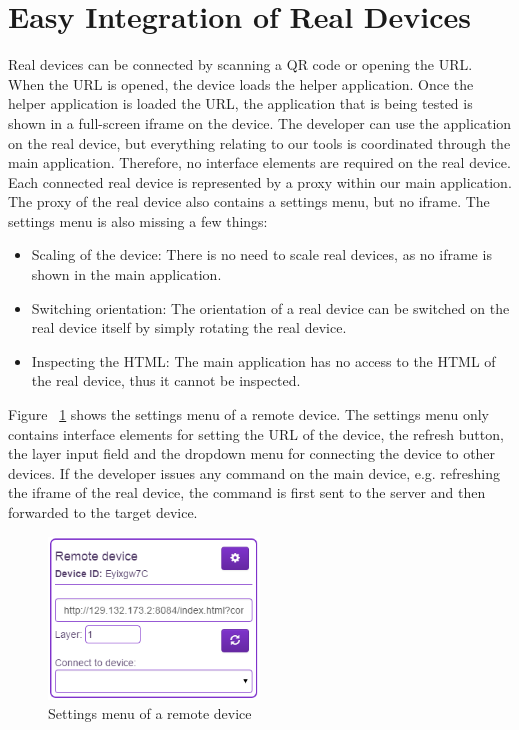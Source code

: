 \section{Easy Integration of Real Devices}

Real devices can be connected by scanning a QR code or opening the URL. When the URL is opened, the device loads the helper application. Once the helper application is loaded the URL, the application that is being tested is shown in a full-screen iframe on the device. The developer can use the application on the real device, but everything relating to our tools is coordinated through the main application. Therefore, no interface elements are required on the real device. Each connected real device is represented by a proxy within our main application. The proxy of the real device also contains a settings menu, but no iframe. The settings menu is also missing a few things:
\begin{itemize}
	\item Scaling of the device: There is no need to scale real devices, as no iframe is shown in the main application.
	\item Switching orientation: The orientation of a real device can be switched on the real device itself by simply rotating the real device.
	\item Inspecting the HTML: The main application has no access to the HTML of the real device, thus it cannot be inspected.
\end{itemize}
Figure ~\ref{fig:settings_menu_remote} shows the settings menu of a remote device. The settings menu only contains interface elements for setting the URL of the device, the refresh button, the layer input field and the dropdown menu for connecting the device to other devices. If the developer issues any command on the main device, e.g. refreshing the iframe of the real device, the command is first sent to the server and then forwarded to the target device. 

\begin{figure}[H]
  \centering
    \includegraphics[width=0.5\textwidth]{images/screenshots/remote_device.png}
	\caption{Settings menu of a remote device}
	\label{fig:settings_menu_remote}
\end{figure}

